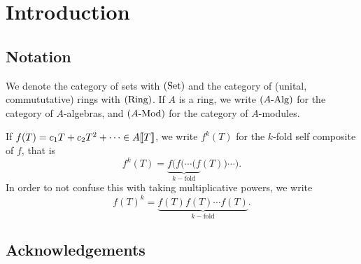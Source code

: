 \documentclass[../main.tex]{subfiles}
\begin{document}
\section*{Introduction} %

\subsection*{Notation} %
We denote the category of sets with ${(\mathrm{Set})}$ and the category of (unital,
commututative) rings with ${(\mathrm{Ring})}$. If $A$ is a ring, we write ${({A}\text-\allowbreak\mathrm{Alg})}$ for the
category of $A$-algebras, and ${({A}\text-\allowbreak\mathrm{Mod})}$ for the category of $A$-modules. 

If $f(T) = c_1 T + c_2 T^2 + \dots \in A\llbracket T \rrbracket$, we write 
$f^k(T)$ for the $k$-fold self composite of $f$, that is
\begin{equation*}
  f^k(T) = \underbrace{f(f( \cdots (f}_{k-\text{fold}}(T)) \cdots).
\end{equation*}
In order to not confuse this with taking multiplicative powers, we write
\begin{equation*}
  f(T)^k = \underbrace{f(T) f(T) \cdots f(T)}_{k-\text{fold}}.
\end{equation*}

\subsection*{Acknowledgements} %

\end{document}
